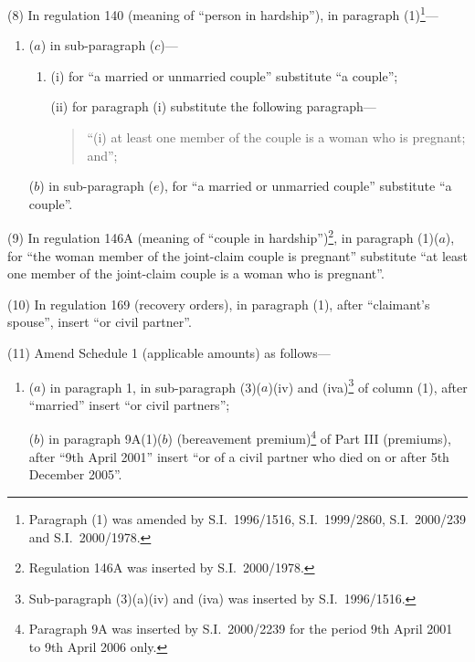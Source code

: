 \documentclass[12pt,a4paper]{article}
\begin{document}
(8) In regulation 140 (meaning of “person in hardship”), in paragraph (1)\footnote{Paragraph (1) was amended by S.I.\ 1996/1516, S.I.\ 1999/2860, S.I.\ 2000/239 and S.I.\ 2000/1978.}—
\begin{enumerate}\item[]
($a$) in sub-paragraph ($c$)—
\begin{enumerate}\item[]
(i) for “a married or unmarried couple” substitute “a couple”;

(ii) for paragraph (i)  substitute the following paragraph—
\begin{quotation}
“(i) at least one member of the couple is a woman who is pregnant; and”;
\end{quotation}
\end{enumerate}

($b$) in sub-paragraph ($e$), for “a married or unmarried couple” substitute “a couple”.
\end{enumerate}

(9) In regulation 146A (meaning of “couple in hardship”)\footnote{Regulation 146A was inserted by S.I.\ 2000/1978.}, in paragraph (1)($a$), for “the woman member of the joint-claim couple is pregnant” substitute “at least one member of the joint-claim couple is a woman who is pregnant”.

(10) In regulation 169 (recovery orders), in paragraph (1), after “claimant’s spouse”, insert “or civil partner”.

(11) Amend Schedule 1 (applicable amounts) as follows—
\begin{enumerate}\item[]
($a$) in paragraph 1, in sub-paragraph (3)($a$)(iv)  and (iva)\footnote{Sub-paragraph (3)(a)(iv) and (iva) was inserted by S.I.\ 1996/1516.} of column (1), after “married” insert “or civil partners”;

($b$) in paragraph 9A(1)($b$)  (bereavement premium)\footnote{Paragraph 9A was inserted by S.I.\ 2000/2239 for the period 9th April 2001 to 9th April 2006 only.} of Part III (premiums), after “9th April 2001” insert “or of a civil partner who died on or after 5th December 2005”.
\end{enumerate}
\end{document}

